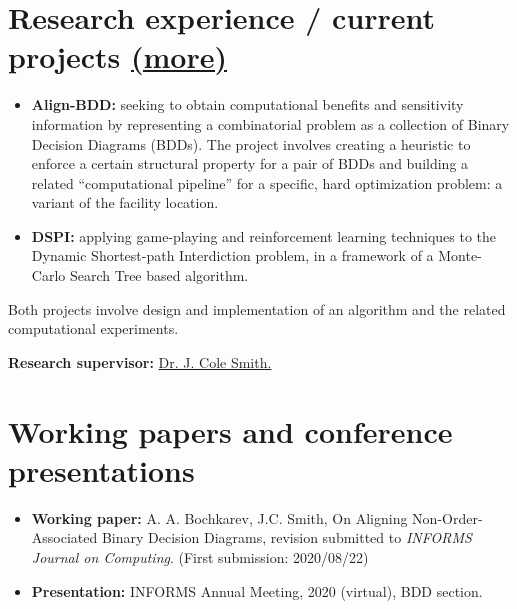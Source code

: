 \documentclass[11pt]{article} \usepackage{geometry} %
\newcommand{\mhref}[1]{\hfill\href{#1}{\small (more\faExternalLink*)}}
\begin{document}
  \section*{Research experience / current projects \mhref{https://www.bochkarev.io/research/}}
  \begin{itemize}
    \itemsep0pt
  \item \textbf{Align-BDD:} seeking to obtain computational benefits and
    sensitivity information by representing a combinatorial problem as a
    collection of Binary Decision Diagrams (BDDs). The project involves creating a heuristic to enforce a
    certain structural property for a pair of BDDs and building a related
    ``computational pipeline'' for a specific, hard optimization problem: a
    variant of the facility location. 
  \item \textbf{DSPI:} applying game-playing and reinforcement
    learning techniques to the Dynamic Shortest-path Interdiction problem,
    in a framework of a Monte-Carlo Search Tree based algorithm.
  \end{itemize} 
  Both projects involve design and implementation of an algorithm and
  the related computational experiments.\vspace{0.5em}

  \noindent\textbf{Research supervisor:}
  \href{https://scholar.google.com/citations?user=87CaUHYAAAAJ&hl=en}{Dr. J. Cole
    Smith.}
  \vspace{0.5em}

 \section*{Working papers and conference presentations}
 \begin{itemize}
    \itemsep0pt
    \item \textbf{Working paper:} A. A. Bochkarev, J.C. Smith, On Aligning
    Non-Order-Associated Binary Decision Diagrams, revision submitted to
    \textit{INFORMS Journal on Computing}. (First submission: 2020/08/22)
    \item \textbf{Presentation:} INFORMS Annual Meeting, 2020 (virtual), BDD section.
 \end{itemize}
\end{document}
